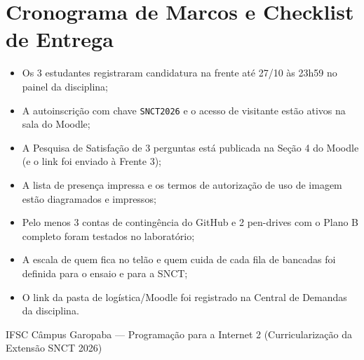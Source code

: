\section{Cronograma de Marcos e Checklist de Entrega}\label{sec:marcos}

\begin{checklist}
\begin{itemize}[label={\caixaMarcar}, itemsep=0.35em]
  \item Os 3 estudantes registraram candidatura na frente até 27/10 às 23h59 no painel da disciplina;
  \item A autoinscrição com chave \texttt{SNCT2026} e o acesso de visitante estão ativos na sala do Moodle;
  \item A Pesquisa de Satisfação de 3 perguntas está publicada na Seção 4 do Moodle (e o link foi enviado à Frente 3);
  \item A lista de presença impressa e os termos de autorização de uso de imagem estão diagramados e impressos;
  \item Pelo menos 3 contas de contingência do GitHub e 2 pen-drives com o Plano B completo foram testados no laboratório;
  \item A escala de quem fica no telão e quem cuida de cada fila de bancadas foi definida para o ensaio e para a SNCT;
  \item O link da pasta de logística/Moodle foi registrado na Central de Demandas da disciplina.
\end{itemize}
\end{checklist}

\vfill
{\centering\footnotesize\color{suave}\faMapMarkerAlt\hspace{0.4em}IFSC Câmpus Garopaba — Programação para a Internet 2 (Curricularização da Extensão SNCT 2026)\par}

